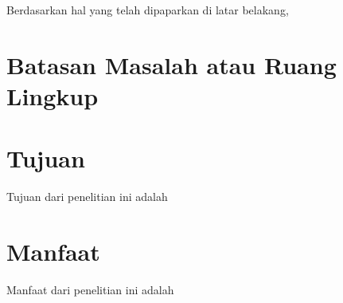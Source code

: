 Berdasarkan hal yang telah dipaparkan di latar belakang, \lipsum[4]

\section{Batasan Masalah atau Ruang Lingkup}

\lipsum[6]

\section{Tujuan}

Tujuan dari penelitian ini adalah \lipsum[7][1-14]

\section{Manfaat}

Manfaat dari penelitian ini adalah \lipsum[8][1-14]
